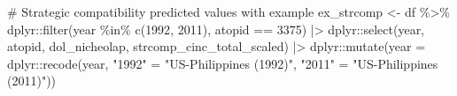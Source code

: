 \documentclass[
  12,
  letterpaper,
  DIV=11,
  numbers=noendperiod]{scrartcl}
\newenvironment{Shaded}{\begin{snugshade}}{\end{snugshade}}
\newcommand{\AttributeTok}[1]{\textcolor[rgb]{0.40,0.45,0.13}{#1}}
\newcommand{\CommentTok}[1]{\textcolor[rgb]{0.37,0.37,0.37}{#1}}
\newcommand{\DecValTok}[1]{\textcolor[rgb]{0.68,0.00,0.00}{#1}}
\newcommand{\FunctionTok}[1]{\textcolor[rgb]{0.28,0.35,0.67}{#1}}
\newcommand{\NormalTok}[1]{\textcolor[rgb]{0.00,0.23,0.31}{#1}}
\newcommand{\OtherTok}[1]{\textcolor[rgb]{0.00,0.23,0.31}{#1}}
\newcommand{\SpecialCharTok}[1]{\textcolor[rgb]{0.37,0.37,0.37}{#1}}
\newcommand{\StringTok}[1]{\textcolor[rgb]{0.13,0.47,0.30}{#1}}
\begin{document}
\begin{Shaded}
\begin{Highlighting}[numbers=left,,]
\CommentTok{\# Strategic compatibility predicted values with example}
\NormalTok{ex\_strcomp }\OtherTok{\textless{}{-}}\NormalTok{ df }\SpecialCharTok{\%\textgreater{}\%}
\NormalTok{  dplyr}\SpecialCharTok{::}\FunctionTok{filter}\NormalTok{(year }\SpecialCharTok{\%in\%} \FunctionTok{c}\NormalTok{(}\DecValTok{1992}\NormalTok{, }\DecValTok{2011}\NormalTok{), atopid }\SpecialCharTok{==} \DecValTok{3375}\NormalTok{) }\SpecialCharTok{|\textgreater{}}
\NormalTok{  dplyr}\SpecialCharTok{::}\FunctionTok{select}\NormalTok{(year, atopid, dol\_nicheolap, strcomp\_cinc\_total\_scaled) }\SpecialCharTok{|\textgreater{}}
\NormalTok{  dplyr}\SpecialCharTok{::}\FunctionTok{mutate}\NormalTok{(}\AttributeTok{year =}\NormalTok{ dplyr}\SpecialCharTok{::}\FunctionTok{recode}\NormalTok{(year, }\StringTok{"1992"} \OtherTok{=} \StringTok{"US{-}Philippines (1992)"}\NormalTok{, }\StringTok{"2011"} \OtherTok{=} \StringTok{"US{-}Philippines (2011)"}\NormalTok{))}


\end{Highlighting}
\end{Shaded}
\end{document}
